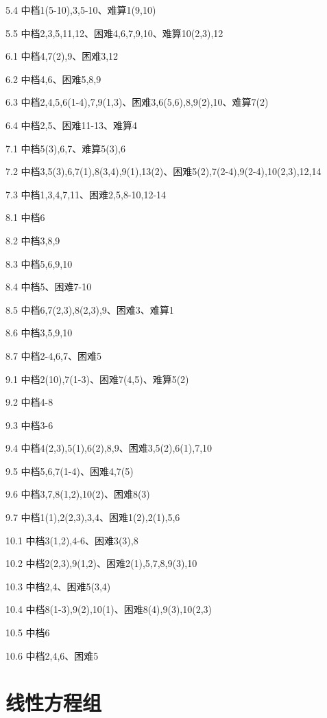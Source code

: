 \documentclass[a4paper,UTF8,fontset=windows]{ctexart}
\begin{document}
5.4 中档1(5-10),3,5-10、难算1(9,10)

5.5 中档2,3,5,11,12、困难4,6,7,9,10、难算10(2,3),12

6.1 中档4,7(2),9、困难3,12

6.2 中档4,6、困难5,8,9

6.3 中档2,4,5,6(1-4),7,9(1,3)、困难3,6(5,6),8,9(2),10、难算7(2)

6.4 中档2,5、困难11-13、难算4

7.1 中档5(3),6,7、难算5(3),6

7.2 中档3,5(3),6,7(1),8(3,4),9(1),13(2)、困难5(2),7(2-4),9(2-4),10(2,3),12,14

7.3 中档1,3,4,7,11、困难2,5,8-10,12-14

8.1 中档6

8.2 中档3,8,9

8.3 中档5,6,9,10

8.4 中档5、困难7-10

8.5 中档6,7(2,3),8(2,3),9、困难3、难算1

8.6 中档3,5,9,10

8.7 中档2-4,6,7、困难5

9.1 中档2(10),7(1-3)、困难7(4,5)、难算5(2)

9.2 中档4-8

9.3 中档3-6

9.4 中档4(2,3),5(1),6(2),8,9、困难3,5(2),6(1),7,10

9.5 中档5,6,7(1-4)、困难4,7(5)

9.6 中档3,7,8(1,2),10(2)、困难8(3)

9.7 中档1(1),2(2,3),3,4、困难1(2),2(1),5,6

10.1 中档3(1,2),4-6、困难3(3),8

10.2 中档2(2,3),9(1,2)、困难2(1),5,7,8,9(3),10

10.3 中档2,4、困难5(3,4)

10.4 中档8(1-3),9(2),10(1)、困难8(4),9(3),10(2,3)

10.5 中档6

10.6 中档2,4,6、困难5

\section{线性方程组}
\end{document}
